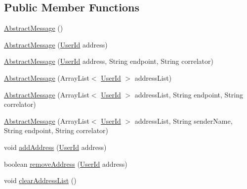 \subsection*{Public Member Functions}
\begin{DoxyCompactItemize}
\item 
\hyperlink{classcom_1_1bluevia_1_1messagery_1_1data_1_1AbstractMessage_a1598e1153610850f90cf7d07b72a61ab}{AbstractMessage} ()
\item 
\hyperlink{classcom_1_1bluevia_1_1messagery_1_1data_1_1AbstractMessage_ad0f90083f88b60b5e1b523a4e979aff0}{AbstractMessage} (\hyperlink{classcom_1_1bluevia_1_1commons_1_1data_1_1UserId}{UserId} address)
\item 
\hyperlink{classcom_1_1bluevia_1_1messagery_1_1data_1_1AbstractMessage_a1386cc45fcd89cd8029496b1cabd62c0}{AbstractMessage} (\hyperlink{classcom_1_1bluevia_1_1commons_1_1data_1_1UserId}{UserId} address, String endpoint, String correlator)
\item 
\hyperlink{classcom_1_1bluevia_1_1messagery_1_1data_1_1AbstractMessage_ae4349a37ea10f8f6400582e9ab08a2a4}{AbstractMessage} (ArrayList$<$ \hyperlink{classcom_1_1bluevia_1_1commons_1_1data_1_1UserId}{UserId} $>$ addressList)
\item 
\hyperlink{classcom_1_1bluevia_1_1messagery_1_1data_1_1AbstractMessage_a3719657309f77bacd7ca0a9e35f8d34c}{AbstractMessage} (ArrayList$<$ \hyperlink{classcom_1_1bluevia_1_1commons_1_1data_1_1UserId}{UserId} $>$ addressList, String endpoint, String correlator)
\item 
\hyperlink{classcom_1_1bluevia_1_1messagery_1_1data_1_1AbstractMessage_aad2c0bf5753d2f9d63cd8d08e0830a22}{AbstractMessage} (ArrayList$<$ \hyperlink{classcom_1_1bluevia_1_1commons_1_1data_1_1UserId}{UserId} $>$ addressList, String senderName, String endpoint, String correlator)
\item 
void \hyperlink{classcom_1_1bluevia_1_1messagery_1_1data_1_1AbstractMessage_a923fff0e55d3f85fd0e215c860e31f85}{addAddress} (\hyperlink{classcom_1_1bluevia_1_1commons_1_1data_1_1UserId}{UserId} address)
\item 
boolean \hyperlink{classcom_1_1bluevia_1_1messagery_1_1data_1_1AbstractMessage_a761ad2ca7e97e9471d7d6f56c979e693}{removeAddress} (\hyperlink{classcom_1_1bluevia_1_1commons_1_1data_1_1UserId}{UserId} address)
\item 
void \hyperlink{classcom_1_1bluevia_1_1messagery_1_1data_1_1AbstractMessage_a0d5e116d8dabbd7bce62340fef3c0ca5}{clearAddressList} ()
\item 

\end{DoxyCompactItemize}
